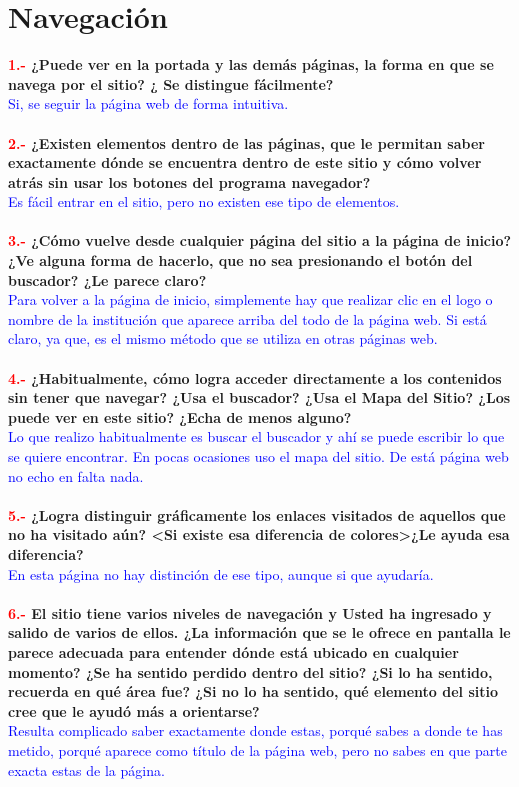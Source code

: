 \documentclass[openany,overnay,a4paper, twoside, 14pt]{book}
\begin{document}
\chapter*{Navegación}
\textbf{\textcolor{red}{1.-} ¿Puede ver en la portada y las demás páginas, la forma en que se navega por el sitio? ¿ Se distingue fácilmente?}\\
\textcolor{blue}{Si, se seguir la página web de forma intuitiva.}\\
\\
\textbf{\textcolor{red}{2.- }¿Existen elementos dentro de las páginas, que le permitan saber exactamente dónde se encuentra dentro de este sitio y cómo volver atrás sin usar los botones del programa navegador? }\\
\textcolor{blue}{Es fácil entrar en el sitio, pero no existen ese tipo de elementos.}\\
\\
\textbf{\textcolor{red}{3.-} ¿Cómo vuelve desde cualquier página del sitio a la página de inicio? ¿Ve alguna forma de hacerlo, que no sea presionando el botón del buscador? ¿Le parece claro?}\\
\textcolor{blue}{Para volver a la página de inicio, simplemente hay que realizar clic en el logo o nombre de la institución que aparece arriba del todo de la página web. Si está claro, ya que, es el mismo método que se utiliza en otras páginas web.}\\
\\
\textbf{\textcolor{red}{4.-} ¿Habitualmente, cómo logra acceder directamente a los contenidos sin tener que navegar? ¿Usa el buscador? ¿Usa el Mapa del Sitio? ¿Los puede ver en este sitio? ¿Echa de menos alguno?}\\
\textcolor{blue}{Lo que realizo habitualmente es buscar el buscador y ahí se puede escribir lo que se quiere encontrar. En pocas ocasiones uso el mapa del sitio. De está página web no echo en falta nada.}\\
\\
\textbf{\textcolor{red}{5.-} ¿Logra distinguir gráficamente los enlaces visitados de aquellos que no ha visitado aún? <Si existe esa diferencia de colores>¿Le ayuda esa diferencia?}\\
\textcolor{blue}{En esta página no hay distinción de ese tipo, aunque si que ayudaría.}\\
\\
\textbf{\textcolor{red}{6.-} El sitio tiene varios niveles de navegación y Usted ha ingresado y salido de varios de ellos. ¿La información que se le ofrece en pantalla le parece adecuada para entender dónde está ubicado en cualquier momento? ¿Se ha sentido perdido dentro del sitio? ¿Si lo ha sentido, recuerda en qué área fue? ¿Si no lo ha sentido, qué elemento del sitio cree que le ayudó más a orientarse?}\\
\textcolor{blue}{Resulta complicado saber exactamente donde estas, porqué sabes a donde te has metido, porqué aparece como título de la página web, pero no sabes en que parte exacta estas de la página.}\\
\\
\end{document}
